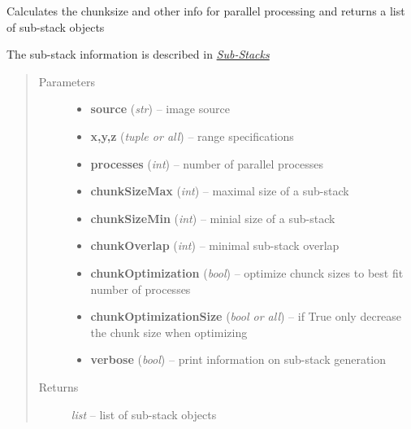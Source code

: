 \documentclass[letterpaper,10pt,english]{sphinxmanual}
\begin{document}

\begin{fulllineitems}
\label{api/ClearMap.ImageProcessing:ClearMap.ImageProcessing.StackProcessing.calculateSubStacks}
Calculates the chunksize and other info for parallel processing and returns a list of sub-stack objects

The sub-stack information is described in {\hyperref[api/ClearMap.ImageProcessing:substack]{\emph{Sub-Stacks}}}
\begin{quote}\begin{description}
\item[{Parameters}] \leavevmode\begin{itemize}
\item {} 
\textbf{source} (\emph{str}) --
image source

\item {} 
\textbf{x,y,z} (\emph{tuple or all}) --
range specifications

\item {} 
\textbf{processes} (\emph{int}) --
number of parallel processes

\item {} 
\textbf{chunkSizeMax} (\emph{int}) --
maximal size of a sub-stack

\item {} 
\textbf{chunkSizeMin} (\emph{int}) --
minial size of a sub-stack

\item {} 
\textbf{chunkOverlap} (\emph{int}) --
minimal sub-stack overlap

\item {} 
\textbf{chunkOptimization} (\emph{bool}) --
optimize chunck sizes to best fit number of processes

\item {} 
\textbf{chunkOptimizationSize} (\emph{bool or all}) --
if True only decrease the chunk size when optimizing

\item {} 
\textbf{verbose} (\emph{bool}) --
print information on sub-stack generation

\end{itemize}

\item[{Returns}] \leavevmode
\emph{list} --
list of sub-stack objects

\end{description}\end{quote}

\end{fulllineitems}
\end{document}
